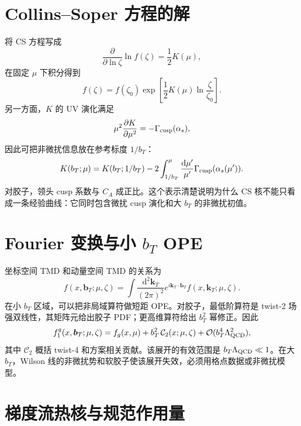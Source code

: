 \documentclass[UTF8,12pt,a4paper,twoside,openany]{ctexbook}
\newcommand{\dd}{\mathrm{d}}
\newcommand{\bT}{\boldsymbol b_T}
\newcommand{\kT}{\boldsymbol k_T}
\begin{document}
\section{Collins--Soper 方程的解}

将 CS 方程写成
\begin{equation}
  \frac{\partial}{\partial\ln\zeta}
  \ln f(\zeta)=\frac12K(\mu),
  \label{eq:cslog}
\end{equation}
在固定 \(\mu\) 下积分得到
\begin{equation}
  f(\zeta)=f(\zeta_0)
  \exp\left[\frac12K(\mu)\ln\frac{\zeta}{\zeta_0}\right].
  \label{eq:cs-solution}
\end{equation}
另一方面，\(K\) 的 UV 演化满足
\begin{equation}
  \mu^2\frac{\partial K}{\partial\mu^2}
  =-\Gamma_{\rm cusp}(\alpha_s),
  \label{eq:k-rge-detail}
\end{equation}
因此可把非微扰信息放在参考标度 \(1/b_T\)：
\begin{equation}
  K(b_T;\mu)
  =K(b_T;1/b_T)
  -2\int_{1/b_T}^{\mu}\frac{\dd\mu'}{\mu'}
  \Gamma_{\rm cusp}(\alpha_s(\mu')).
  \label{eq:k-solution}
\end{equation}
对胶子，领头 cusp 系数与 \(C_A\) 成正比。这个表示清楚说明为什么 CS 核不能只看成一条经验曲线：它同时包含微扰 cusp 演化和大 \(b_T\) 的非微扰初值。

\section{Fourier 变换与小 \texorpdfstring{\(b_T\)}{bT} OPE}

坐标空间 TMD 和动量空间 TMD 的关系为
\begin{equation}
  f(x,\bT;\mu,\zeta)
  =\int\frac{\dd^2\kT}{(2\pi)^2}
  e^{i\kT\cdot\bT}f(x,\kT;\mu,\zeta).
  \label{eq:fourierTMD}
\end{equation}
在小 \(b_T\) 区域，可以把非局域算符做短距 OPE。对胶子，最低阶算符是 twist-2 场强双线性，其矩阵元给出胶子 PDF；更高维算符给出 \(b_T^2\) 幂修正。因此
\begin{equation}
  f_1^g(x,\bT;\mu,\zeta)
  =f_g(x,\mu)
  +b_T^2\,\mathcal C_2(x;\mu,\zeta)
  +\mathcal O(b_T^4\Lambda_{\rm QCD}^2),
  \label{eq:smallb}
\end{equation}
其中 \(\mathcal C_2\) 概括 twist-4 和方案相关贡献。该展开的有效范围是 \(b_T\Lambda_{\rm QCD}\ll1\)。在大 \(b_T\)，Wilson 线的非微扰势和软胶子使该展开失效，必须用格点数据或非微扰模型。

\section{梯度流热核与规范作用量}
\end{document}
